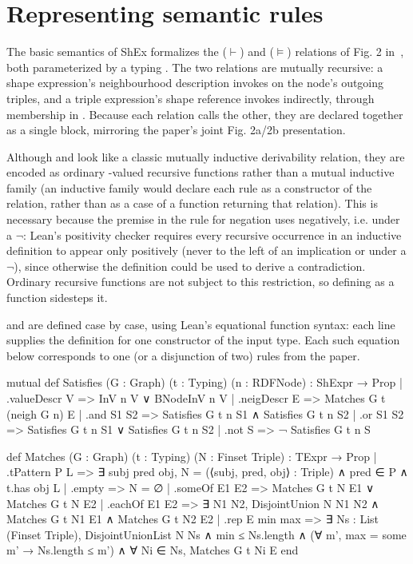 \section{Representing semantic rules} \label{sec:semantics_lean}

The basic semantics of ShEx formalizes the  ($\vdash$) and  ($\vDash$)
 relations of Fig. 2 in~\cite{BGP17}, both parameterized by a typing .
The two relations are mutually recursive: a shape expression's neighbourhood
 description invokes  on the node's outgoing triples, and a
 triple expression's shape reference invokes  indirectly,
 through membership in .
Because each relation calls the other, they are declared together as a
 single  block, mirroring the paper's joint Fig. 2a/2b
 presentation.

Although  and  look like a classic mutually
 inductive derivability relation, they are encoded as ordinary
 -valued recursive functions rather than a mutual inductive
 family (an inductive family would declare each rule as a constructor of
 the relation, rather than as a case of a function returning that relation).
 This is necessary because the premise in the rule for negation
 uses  negatively, i.e. under a $\neg$: Lean's positivity
 checker requires every recursive occurrence in an inductive definition to
 appear only positively (never to the left of an implication or under a
 $\neg$), since otherwise the definition could be used to derive a
 contradiction. Ordinary recursive functions are not subject to this
 restriction, so defining  as a function sidesteps it.

 and  are defined case by case, using Lean's
 equational function syntax: each  line
 supplies the definition for one constructor of the input type. Each such
 equation below corresponds to one (or a disjunction of two) rules from the
 paper.

\begin{leanlisting}
mutual
def Satisfies (G : Graph) (t : Typing) (n : RDFNode) : ShExpr → Prop
  | .valueDescr V => InV n V ∨ BNodeInV n V
  | .neigDescr E => Matches G t (neigh G n) E
  | .and S1 S2 => Satisfies G t n S1 ∧ Satisfies G t n S2
  | .or S1 S2 => Satisfies G t n S1 ∨ Satisfies G t n S2
  | .not S => ¬ Satisfies G t n S

def Matches (G : Graph) (t : Typing) (N : Finset Triple) : TExpr → Prop
  | .tPattern P L =>
      ∃ subj pred obj, N = {(⟨subj, pred, obj⟩ : Triple)} ∧ pred ∈ P ∧ t.has obj L
  | .empty => N = ∅
  | .someOf E1 E2 => Matches G t N E1 ∨ Matches G t N E2
  | .eachOf E1 E2 =>
      ∃ N1 N2, DisjointUnion N N1 N2 ∧
               Matches G t N1 E1 ∧
               Matches G t N2 E2
  | .rep E min max =>
      ∃ Ns : List (Finset Triple),
        DisjointUnionList N Ns ∧
        min ≤ Ns.length ∧
        (∀ m', max = some m' → Ns.length ≤ m') ∧
        ∀ Ni ∈ Ns, Matches G t Ni E
end
\end{leanlisting}

